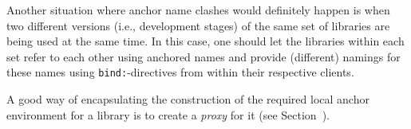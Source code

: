 Another situation where anchor name clashes would definitely happen is
when two different versions (i.e., development stages) of the same set
of libraries are being used at the same time.  In this case, one
should let the libraries within each set refer to each other using
anchored names and provide (different) namings for these names using
{\tt bind:}-directives from within their respective clients.

A good way of encapsulating the construction of the required local
anchor environment for a library is to create a {\em proxy} for it
(see Section~).
